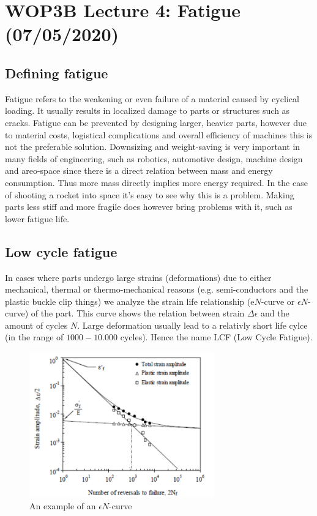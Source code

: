 \documentclass[11pt, a4paper]{article}
\begin{document}
\setcounter{equation}{0}
\setcounter{section}{3}

\section{WOP3B Lecture 4: Fatigue (07/05/2020)}


\subsection{Defining fatigue}
Fatigue refers to the weakening or even failure of a material caused by cyclical loading. It usually results in localized damage to parts or structures such as cracks. Fatigue can be prevented by designing larger, heavier parts, however due to material costs, logistical complications and overall efficiency of machines this is not the preferable solution. Downsizing and weight-saving is very important in many fields of engineering, such as robotics, automotive design, machine design and areo-space since there is a direct relation between mass and energy consumption. Thus more mass directly implies more energy required. In the case of shooting a rocket into space it's easy to see why this is a problem. Making parts less stiff and more fragile does however bring problems with it, such as lower fatigue life.


\subsection{Low cycle fatigue}
In cases where parts undergo large strains (deformations) due to either mechanical, thermal or thermo-mechanical reasons (e.g. semi-conductors and the plastic buckle clip things) we analyze the strain life relationship (e$N$-curve or $\epsilon N$-curve) of the part. This curve shows the relation between strain $\Delta \epsilon$ and the amount of cycles $N$. Large deformation usually lead to a relativly short life cylce (in the range of $1000-10.000$ cycles). Hence the name LCF (Low Cycle Fatigue).
\begin{figure}[h]
  \centerline{\includegraphics[width=80mm]{images/eN_curve.png}}
  \caption{An example of an $\epsilon N$-curve}
  \label{fig:eN}
\end{figure}
\end{document}

